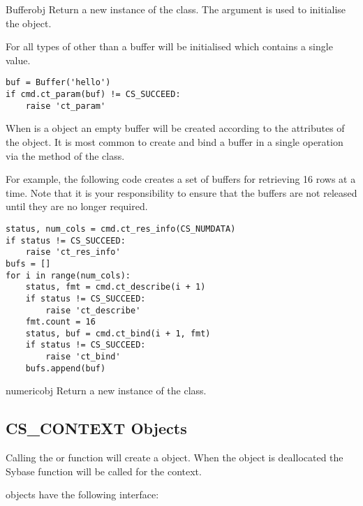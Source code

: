 \begin{funcdesc}{Buffer}{obj}
Return a new instance of the  class.  The 
argument is used to initialise the  object.

For all types of  other than  a buffer will
be initialised which contains a single value.

\begin{verbatim}
buf = Buffer('hello')
if cmd.ct_param(buf) != CS_SUCCEED:
    raise 'ct_param'
\end{verbatim}

When  is a  object an empty buffer will be
created according to the attributes of the  object.
It is most common to create and bind a buffer in a single operation
via the  method of the  class.

For example, the following code creates a set of buffers for
retrieving 16 rows at a time.  Note that it is your responsibility to
ensure that the buffers are not released until they are no longer
required.

\begin{verbatim}
status, num_cols = cmd.ct_res_info(CS_NUMDATA)
if status != CS_SUCCEED:
    raise 'ct_res_info'
bufs = []
for i in range(num_cols):
    status, fmt = cmd.ct_describe(i + 1)
    if status != CS_SUCCEED:
        raise 'ct_describe'
    fmt.count = 16
    status, buf = cmd.ct_bind(i + 1, fmt)
    if status != CS_SUCCEED:
        raise 'ct_bind'
    bufs.append(buf)
\end{verbatim}
\end{funcdesc}

\begin{funcdesc}{numeric}{obj  }
Return a new instance of the  class.
\end{funcdesc}

\subsection{CS_CONTEXT Objects}

Calling the  or 
function will create a  object.  When the
 object is deallocated the Sybase
 function will be called for the context.

 objects have the following interface:

